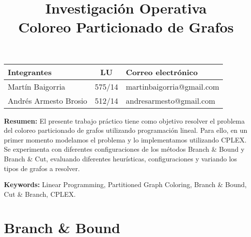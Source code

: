 \documentclass[10pt,a4paper]{article}
\title{Investigación Operativa \\ Coloreo Particionado de Grafos}
\begin{document}
\nocite{*}


\maketitle

\bigskip

\begin{table}[h]
\centering
\begin{tabular}{|l l l|}
\hline
Integrantes       & \multicolumn{1}{c}{LU}     & Correo electrónico        \\ \hline
Martín Baigorria & \multicolumn{1}{c}{575/14} & martinbaigorria@gmail.com \\ 
Andrés Armesto Brosio & 512/14 & andresarmesto@gmail.com \\  \hline
\end{tabular}
\end{table}

\vfill
\textbf{Resumen:} El presente trabajo práctico tiene como objetivo resolver el problema del coloreo particionado de grafos utilizando programación lineal. Para ello, en un primer momento modelamos el problema y lo implementamos utilizando CPLEX. Se experimenta con diferentes configuraciones de los métodos Branch \& Bound y Branch \& Cut, evaluando diferentes heurísticas, configuraciones y variando los tipos de grafos a resolver.

\textbf{Keywords:} Linear Programming, Partitioned Graph Coloring, Branch \& Bound, Cut \& Branch, CPLEX.

\newpage
\tableofcontents
\newpage



\newpage
\section{Branch \& Bound}
\end{document}
